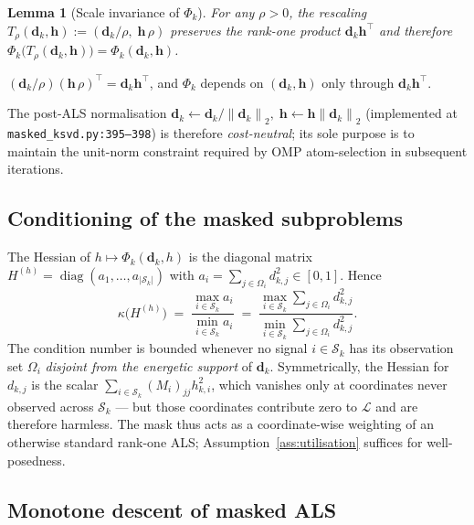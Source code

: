 \documentclass[journal,onecolumn,11pt]{IEEEtran}
\newtheorem{lemma}[theorem]{Lemma}
\theoremstyle{definition}
\newcommand{\Loss}{\mathcal{L}}
\newcommand{\norm}[1]{\left\lVert #1 \right\rVert}
\newcommand{\diag}{\operatorname{diag}}
\newcommand{\Sk}{\mathcal{S}_k}
\newcommand{\Om}{\Omega}
\newcommand{\dvec}{\bm{d}}
\newcommand{\hvec}{\bm{h}}
\begin{document}
\begin{lemma}[Scale invariance of $\Phi_k$]
\label{lem:scale}
For any $\rho>0$, the rescaling
$T_\rho(\dvec_k,\hvec):=(\dvec_k/\rho,\;\hvec\,\rho)$ preserves the rank-one
product $\dvec_k\hvec^\top$ and therefore
$\Phi_k\bigl(T_\rho(\dvec_k,\hvec)\bigr)=\Phi_k(\dvec_k,\hvec)$.
\end{lemma}
\begin{IEEEproof}
$(\dvec_k/\rho)(\hvec\,\rho)^\top=\dvec_k\hvec^\top$, and $\Phi_k$ depends on
$(\dvec_k,\hvec)$ only through $\dvec_k\hvec^\top$.
\end{IEEEproof}
The post-ALS normalisation
$\dvec_k\leftarrow\dvec_k/\norm{\dvec_k}_2,\;\hvec\leftarrow\hvec\norm{\dvec_k}_2$
(implemented at \texttt{masked\_ksvd.py:395--398}) is therefore
\emph{cost-neutral}; its sole purpose is to maintain the unit-norm
constraint required by OMP atom-selection in subsequent iterations.

\subsection{Conditioning of the masked subproblems}
\label{sec:conditioning}

The Hessian of $h\mapsto\Phi_k(\dvec_k,h)$ is the diagonal matrix
$H^{(h)}=\diag(a_1,\dots,a_{|\Sk|})$ with
$a_i=\sum_{j\in\Om_i} d_{k,j}^2 \in[0,1]$. Hence
\begin{equation}
\kappa\!\bigl(H^{(h)}\bigr)
\;=\;
\frac{\max_{i\in\Sk} a_i}{\min_{i\in\Sk} a_i}
\;=\;
\frac{\max_{i\in\Sk}\sum_{j\in\Om_i}d_{k,j}^2}
     {\min_{i\in\Sk}\sum_{j\in\Om_i}d_{k,j}^2}.
\label{eq:cond-h}
\end{equation}
The condition number is bounded whenever no signal $i\in\Sk$ has its
observation set $\Om_i$ \emph{disjoint from the energetic support} of
$\dvec_k$. Symmetrically, the Hessian for $d_{k,j}$ is the scalar
$\sum_{i\in\Sk}(M_i)_{jj}h_{k,i}^2$, which vanishes only at coordinates
never observed across $\Sk$ — but those coordinates contribute zero to
$\Loss$ and are therefore harmless. The mask thus acts as a
coordinate-wise weighting of an otherwise standard rank-one ALS;
Assumption~\ref{ass:utilisation} suffices for well-posedness.

\subsection{Monotone descent of masked ALS}
\end{document}
